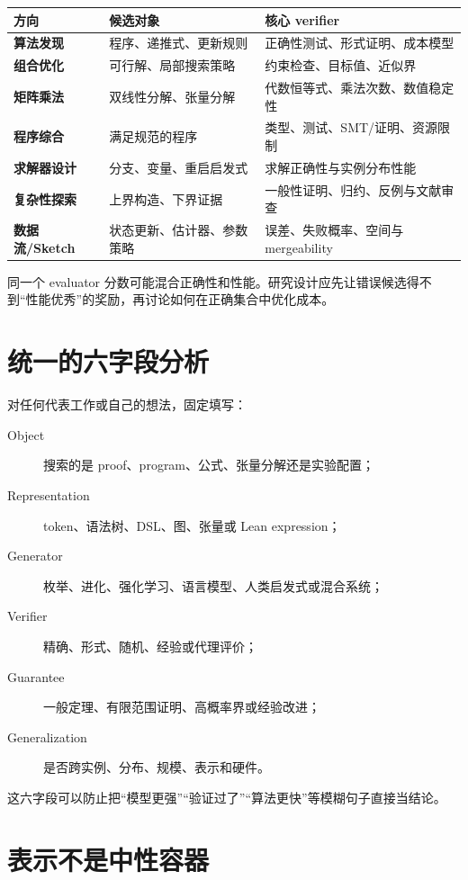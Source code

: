 \begin{center}
\begin{tabularx}{0.96\textwidth}{>{\bfseries}lX X}
\toprule
方向 & 候选对象 & 核心 verifier \\
\midrule
算法发现 & 程序、递推式、更新规则 & 正确性测试、形式证明、成本模型 \\
组合优化 & 可行解、局部搜索策略 & 约束检查、目标值、近似界 \\
矩阵乘法 & 双线性分解、张量分解 & 代数恒等式、乘法次数、数值稳定性 \\
程序综合 & 满足规范的程序 & 类型、测试、SMT/证明、资源限制 \\
求解器设计 & 分支、变量、重启启发式 & 求解正确性与实例分布性能 \\
复杂性探索 & 上界构造、下界证据 & 一般性证明、归约、反例与文献审查 \\
数据流/Sketch & 状态更新、估计器、参数策略 & 误差、失败概率、空间与 mergeability \\
\bottomrule
\end{tabularx}
\end{center}

同一个 evaluator 分数可能混合正确性和性能。研究设计应先让错误候选得不到“性能优秀”的奖励，再讨论如何在正确集合中优化成本。

\section{统一的六字段分析}

对任何代表工作或自己的想法，固定填写：
\begin{description}
  \item[Object] 搜索的是 proof、program、公式、张量分解还是实验配置；
  \item[Representation] token、语法树、DSL、图、张量或 Lean expression；
  \item[Generator] 枚举、进化、强化学习、语言模型、人类启发式或混合系统；
  \item[Verifier] 精确、形式、随机、经验或代理评价；
  \item[Guarantee] 一般定理、有限范围证明、高概率界或经验改进；
  \item[Generalization] 是否跨实例、分布、规模、表示和硬件。
\end{description}

这六字段可以防止把“模型更强”“验证过了”“算法更快”等模糊句子直接当结论。

\section{表示不是中性容器}

